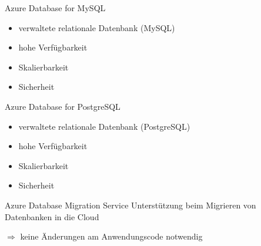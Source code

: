 \begin{flashcard}[Describe]{Azure Database for MySQL}
    \begin{itemize}
        \item verwaltete relationale Datenbank (MySQL)
        \item hohe Verfügbarkeit
        \item Skalierbarkeit
        \item Sicherheit
    \end{itemize}
\end{flashcard}

\begin{flashcard}[Definition]{Azure Database for PostgreSQL}
    \begin{itemize}
        \item verwaltete relationale Datenbank (PostgreSQL)
        \item hohe Verfügbarkeit
        \item Skalierbarkeit
        \item Sicherheit
    \end{itemize}
\end{flashcard}

\begin{flashcard}[Describe]{Azure Database Migration Service}
    Unterstützung beim Migrieren von Datenbanken in die Cloud

    $\Rightarrow$ keine Änderungen am Anwendungscode notwendig
\end{flashcard}

